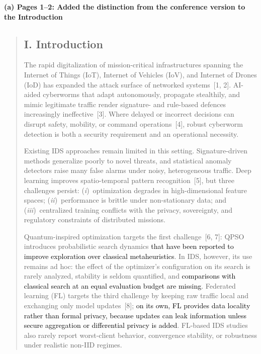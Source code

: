 \documentclass[11pt]{article}
\newenvironment{excerpt}{\begin{quote}\sloppy}{\end{quote}}
\newcommand{\mshead}[2]{\subsection*{\textbf{#1. #2}}}
\newcommand{\loc}[1]{\par\medskip\noindent\textbf{#1}\par}
\begin{document}
\loc{(a) Pages 1--2: Added the distinction from the conference version to the Introduction}
\begin{excerpt}
\mshead{I}{Introduction}

The rapid digitalization of mission-critical infrastructures spanning
the Internet of Things (IoT), Internet of Vehicles (IoV), and Internet
of Drones (IoD) has expanded the attack surface of networked
systems~{[1, 2]}. AI-aided cyberworms that
adapt autonomously, propagate stealthily, and mimic legitimate
traffic render signature- and rule-based defences increasingly
ineffective~{[3]}. Where delayed or incorrect decisions can
disrupt safety, mobility, or command operations~{[4]},
robust cyberworm detection is both a security requirement and an
operational necessity.

Existing IDS approaches remain limited in this setting.
Signature-driven methods generalize poorly to novel threats, and
statistical anomaly detectors raise many false alarms under noisy,
heterogeneous traffic. Deep learning improves spatio-temporal pattern
recognition~{[5]}, but three challenges persist:
(\textit{i})~optimization degrades in high-dimensional feature spaces;
(\textit{ii})~performance is brittle under non-stationary data; and
(\textit{iii})~centralized training conflicts with the privacy,
sovereignty, and regulatory constraints of distributed missions.

Quantum-inspired optimization targets the first
challenge~{[6, 7]}: QPSO introduces
probabilistic search dynamics \textcolor{black}{that have been reported
to improve exploration over classical metaheuristics}. In IDS,
however, its use remains ad hoc: the effect of the optimizer's
configuration on its search is rarely analyzed, stability is seldom quantified, and
\textcolor{black}{comparisons with classical search at an equal
evaluation budget are missing}. Federated learning (FL) targets the
third challenge by keeping raw traffic local and exchanging only
model updates~{[8]}; \textcolor{black}{on its
own, FL provides data locality rather than formal privacy, because
updates can leak information unless secure aggregation or
differential privacy is added}. FL-based IDS studies also rarely
report worst-client behavior, convergence stability, or robustness
under realistic non-IID regimes.


\end{excerpt}
\end{document}
